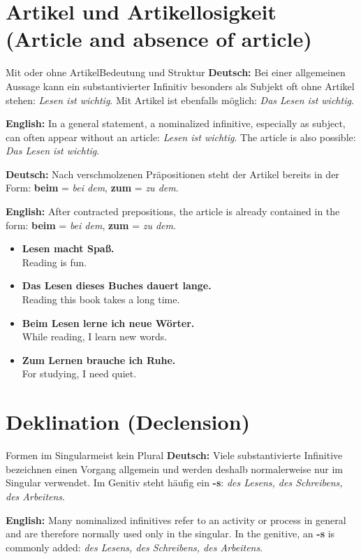 \documentclass[a4paper,11pt]{article}
\newcommand{\GermanText}[1]{\textbf{Deutsch: }#1\par}
\newcommand{\EnglishText}[1]{{\small\color{SoftGray}\textbf{English: }#1\par}}
\newcommand{\ExampleItem}[2]{\item \textbf{#1}\\{\small\color{SoftGray}#2}}
\begin{document}
\section{Artikel und Artikellosigkeit \textnormal{(Article and absence of article)}}
\begin{grammarentry}{Mit oder ohne Artikel}{Bedeutung und Struktur}
\GermanText{Bei einer allgemeinen Aussage kann ein substantivierter Infinitiv besonders als Subjekt oft ohne Artikel stehen: \textit{Lesen ist wichtig}. Mit Artikel ist ebenfalls möglich: \textit{Das Lesen ist wichtig}.}
\EnglishText{In a general statement, a nominalized infinitive, especially as subject, can often appear without an article: \textit{Lesen ist wichtig}. The article is also possible: \textit{Das Lesen ist wichtig}.}

\GermanText{Nach verschmolzenen Präpositionen steht der Artikel bereits in der Form: \textbf{beim} = \textit{bei dem}, \textbf{zum} = \textit{zu dem}.}
\EnglishText{After contracted prepositions, the article is already contained in the form: \textbf{beim} = \textit{bei dem}, \textbf{zum} = \textit{zu dem}.}
\end{grammarentry}

\begin{exbox}
\begin{itemize}
\ExampleItem{Lesen macht Spaß.}{Reading is fun.}
\ExampleItem{Das Lesen dieses Buches dauert lange.}{Reading this book takes a long time.}
\ExampleItem{Beim Lesen lerne ich neue Wörter.}{While reading, I learn new words.}
\ExampleItem{Zum Lernen brauche ich Ruhe.}{For studying, I need quiet.}
\end{itemize}
\end{exbox}

\section{Deklination \textnormal{(Declension)}}
\begin{grammarentry}{Formen im Singular}{meist kein Plural}
\GermanText{Viele substantivierte Infinitive bezeichnen einen Vorgang allgemein und werden deshalb normalerweise nur im Singular verwendet. Im Genitiv steht häufig ein \textbf{-s}: \textit{des Lesens, des Schreibens, des Arbeitens}.}
\EnglishText{Many nominalized infinitives refer to an activity or process in general and are therefore normally used only in the singular. In the genitive, an \textbf{-s} is commonly added: \textit{des Lesens, des Schreibens, des Arbeitens}.}
\end{grammarentry}
\end{document}
